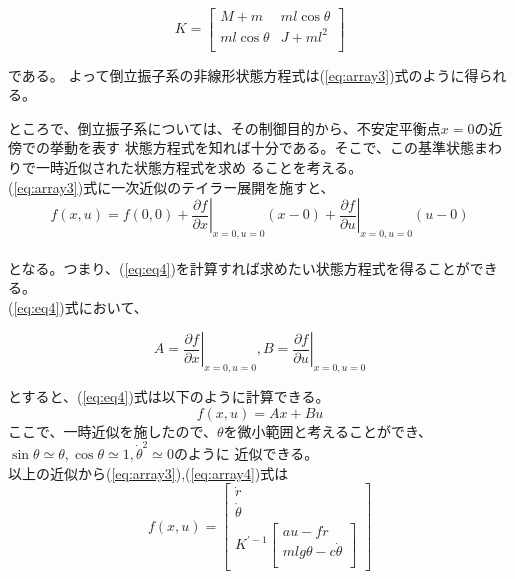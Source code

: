 	\begin{equation}
		K=\left[
		\begin{array}{ccc}
			M+m & ml\cos{\theta}\\
			ml\cos{\theta} & J+ml^{2}\\
		\end{array}
		\right]
		\label{eq:array4}
	\end{equation}
	
	\noindent
	である。
	よって倒立振子系の非線形状態方程式は(\ref{eq:array3})式のように得られる。
	\par
	ところで、倒立振子系については、その制御目的から、不安定平衡点$x=0$の近傍での挙動を表す
	状態方程式を知れば十分である。そこで、この基準状態まわりで一時近似された状態方程式を求め
	ることを考える。\\
	(\ref{eq:array3})式に一次近似のテイラー展開を施すと、\\
	\begin{equation}
		f(x,u) = f(0,0) + \left.\frac{\partial f}{\partial x}\right|_{x=0,u=0}(x-0) + \left.\frac{\partial f}{\partial u}\right|_{x=0,u=0}(u-0)
		\label{eq:eq4}
	\end{equation}
	\\
	となる。つまり、(\ref{eq:eq4})を計算すれば求めたい状態方程式を得ることができる。\\
	(\ref{eq:eq4})式において、
	
	\[A=\left.\frac{\partial f}{\partial x}\right|_{x=0,u=0} , B=\left.\frac{\partial f}{\partial u}\right|_{x=0,u=0}\]
	
	\noindent
	とすると、(\ref{eq:eq4})式は以下のように計算できる。
	\begin{equation}
		f(x,u) = Ax+Bu
		\label{eq:AxBu}
	\end{equation}
	ここで、一時近似を施したので、$\theta$を微小範囲と考えることができ、\\ $\sin{\theta} \simeq  \theta , \cos{\theta} \simeq 1 , \dot{\theta}^{2} \simeq 0$のように
	近似できる。\\
	以上の近似から(\ref{eq:array3}),(\ref{eq:array4})式は\\
	\begin{equation}
		f(x,u)=\left[
		\begin{array}{ccc}
			\dot{r}\\
			\dot{\theta}\\
			K^{'-1}\left[
			\begin{array}{ccc}
				au-f\dot{r}\\
				mlg\theta-c\dot{\theta}\\
			\end{array}
			\right]
		\end{array}
		\right]
		\label{eq:array5}
	\end{equation}
	
